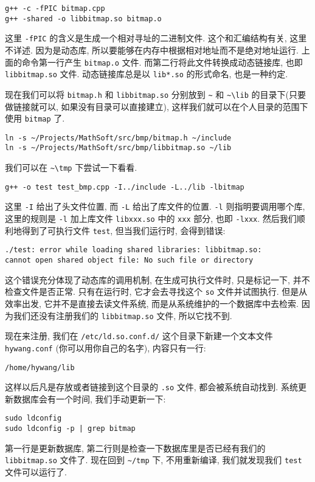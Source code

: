 \documentclass[a4paper]{ctexart}
\begin{document}
\begin{verbatim}
g++ -c -fPIC bitmap.cpp
g++ -shared -o libbitmap.so bitmap.o
\end{verbatim}

这里 \verb|-fPIC| 的含义是生成一个相对寻址的二进制文件. 这个和汇编结构有关, 这里不详述.
因为是动态库, 所以要能够在内存中根据相对地址而不是绝对地址运行. 上面的命令第一行产生
\verb|bitmap.o| 文件. 而第二行将此文件转换成动态链接库, 也即 \verb|libbitmap.so| 文件.
动态链接库总是以 \verb|lib*.so| 的形式命名, 也是一种约定.

现在我们可以将 \verb|bitmap.h| 和 \verb|libbitmap.so| 分别放到 \verb|~|
和 \verb|~\lib| 的目录下(只要做链接就可以, 如果没有目录可以直接建立),
这样我们就可以在个人目录的范围下使用 \verb|bitmap| 了.
\begin{verbatim}
ln -s ~/Projects/MathSoft/src/bmp/bitmap.h ~/include
ln -s ~/Projects/MathSoft/src/bmp/libbitmap.so ~/lib
\end{verbatim}

我们可以在 \verb|~\tmp| 下尝试一下看看.
\begin{verbatim}
g++ -o test test_bmp.cpp -I../include -L../lib -lbitmap
\end{verbatim}
这里 \verb|-I| 给出了头文件位置, 而 \verb|-L| 给出了库文件的位置.
\verb|-l| 则指明要调用哪个库, 这里的规则是 \verb|-l| 加上库文件
\verb|libxxx.so| 中的 \verb|xxx| 部分, 也即 \verb|-lxxx|.
然后我们顺利地得到了可执行文件 \verb|test|, 但当我们运行时, 会得到错误:
\begin{verbatim}
./test: error while loading shared libraries: libbitmap.so: 
cannot open shared object file: No such file or directory
\end{verbatim}

这个错误充分体现了动态库的调用机制, 在生成可执行文件时, 只是标记一下,
并不检查文件是否正常. 只有在运行时, 它才会去寻找这个 \verb|so| 文件并试图执行.
但是从效率出发, 它并不是直接去读文件系统, 而是从系统维护的一个数据库中去检索.
因为我们还没有注册我们的 \verb|libbitmap.so| 文件, 所以它找不到.

现在来注册, 我们在 \verb|/etc/ld.so.conf.d/| 这个目录下新建一个文本文件
\verb|hywang.conf| (你可以用你自己的名字), 内容只有一行: 
\begin{verbatim}
/home/hywang/lib
\end{verbatim}
这样以后凡是存放或者链接到这个目录的 \verb|.so| 文件, 都会被系统自动找到.
系统更新数据库会有一个时间, 我们手动更新一下:
\begin{verbatim}
sudo ldconfig
sudo ldconfig -p | grep bitmap
\end{verbatim}
第一行是更新数据库, 第二行则是检查一下数据库里是否已经有我们的 \verb|libbitmap.so|
文件了. 现在回到 \verb|~/tmp| 下, 不用重新编译, 我们就发现我们 \verb|test|
文件可以运行了. 
\end{document}
